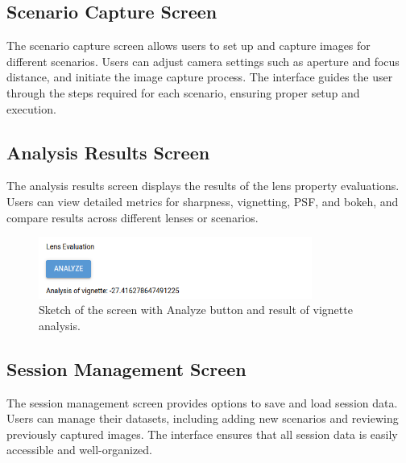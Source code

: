 \subsection{Scenario Capture Screen}

The scenario capture screen allows users to set up and capture images for different scenarios. Users can adjust camera settings such as aperture and focus distance, and initiate the image capture process. The interface guides the user through the steps required for each scenario, ensuring proper setup and execution.


\subsection{Analysis Results Screen}

The analysis results screen displays the results of the lens property evaluations. Users can view detailed metrics for sharpness, vignetting, PSF, and bokeh, and compare results across different lenses or scenarios.

\begin{figure}[h]
\centering
\includegraphics[width=0.8\textwidth]{Images/ui2.png}
\caption{Sketch of the screen with Analyze button and result of vignette analysis.}
\label{fig:ui_main_screen}
\end{figure}

\subsection{Session Management Screen}

The session management screen provides options to save and load session data. Users can manage their datasets, including adding new scenarios and reviewing previously captured images. The interface ensures that all session data is easily accessible and well-organized.

